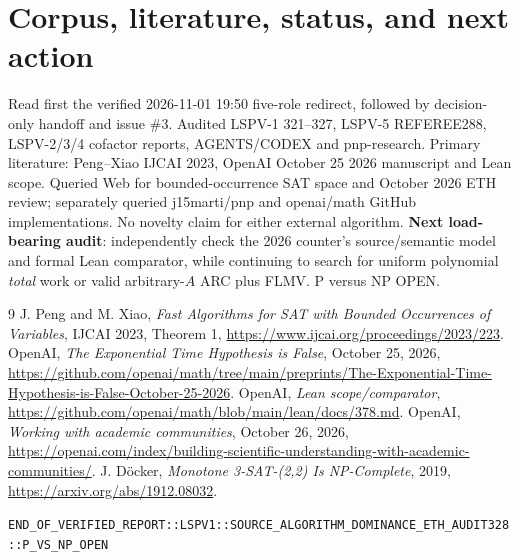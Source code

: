 \documentclass[11pt]{article}
\begin{document}
\section{Corpus, literature, status, and next action}
Read first the verified 2026-11-01 19:50 five-role redirect, followed by decision-only handoff and issue \#3. Audited LSPV-1 321--327, LSPV-5 REFEREE288, LSPV-2/3/4 cofactor reports, AGENTS/CODEX and pnp-research. Primary literature: Peng--Xiao IJCAI 2023, OpenAI October 25 2026 manuscript and Lean scope. Queried Web for bounded-occurrence SAT space and October 2026 ETH review; separately queried j15marti/pnp and openai/math GitHub implementations. No novelty claim for either external algorithm. \textbf{Next load-bearing audit}: independently check the 2026 counter's source/semantic model and formal Lean comparator, while continuing to search for uniform polynomial \emph{total} work or valid arbitrary-$A$ ARC plus FLMV. P versus NP OPEN.
\begin{thebibliography}{9}
 J. Peng and M. Xiao, \emph{Fast Algorithms for SAT with Bounded Occurrences of Variables}, IJCAI 2023, Theorem 1, \url{https://www.ijcai.org/proceedings/2023/223}.
 OpenAI, \emph{The Exponential Time Hypothesis is False}, October 25, 2026, \url{https://github.com/openai/math/tree/main/preprints/The-Exponential-Time-Hypothesis-is-False-October-25-2026}.
 OpenAI, \emph{Lean scope/comparator}, \url{https://github.com/openai/math/blob/main/lean/docs/378.md}.
 OpenAI, \emph{Working with academic communities}, October 26, 2026, \url{https://openai.com/index/building-scientific-understanding-with-academic-communities/}.
 J. D\"ocker, \emph{Monotone 3-SAT-(2,2) Is NP-Complete}, 2019, \url{https://arxiv.org/abs/1912.08032}.
\end{thebibliography}
\noindent\texttt{END\_OF\_VERIFIED\_REPORT::LSPV1::SOURCE\_ALGORITHM\_DOMINANCE\_ETH\_AUDIT328::P\_VS\_NP\_OPEN}
\end{document}

